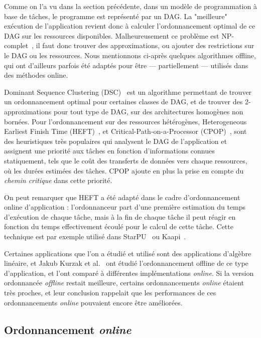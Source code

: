 Comme on l'a vu dans la section précédente, dans un modèle de programmation à base de tâches, le programme est représenté par un DAG.
La "meilleure" exécution de l'application revient donc à calculer l'ordonnancement optimal de ce DAG sur les ressources disponibles.
Malheureusement ce problème est NP-complet~\cite{Cook1971}, il faut donc trouver des approximations, ou ajouter des restrictions sur le DAG ou les ressources.
Nous mentionnons ci-après quelques algorithmes offline, qui ont d'ailleurs parfois été adaptés pour être --- partiellement --- utilisés dans des méthodes online.

Dominant Sequence Clustering (DSC)~\cite{Yang1994} est un algorithme permettant de trouver un ordonnancement optimal pour certaines classes de DAG, et de trouver des 2-approximations pour tout type de DAG, sur des architectures homogènes non bornées.
Pour l'ordonnancement sur des ressources hétérogènes, Heterogeneous Earliest Finish Time (HEFT)~\cite{HEFT}, et Critical-Path-on-a-Processor (CPOP)~\cite{HEFT}, sont des heuristiques très populaires qui analysent le DAG de l'application et assignent une priorité aux tâches en fonction d'informations connues statiquement, tels que le coût des transferts de données vers chaque ressources, où les durées estimées des tâches.
CPOP ajoute en plus la prise en compte du \emph{chemin critique} dans cette priorité.

On peut remarquer que HEFT a été adapté dans le cadre d'ordonnancement online d'application : l'ordonnanceur part d'une première estimation du temps d'exécution de chaque tâche, mais à la fin de chaque tâche il peut réagir en fonction du temps effectivement écoulé pour le calcul de cette tâche. Cette technique est par exemple utilisé dans StarPU~\cite{StarPU} ou Kaapi~\cite{Lima2015}.

Certaines applications que l'on a étudié et utilisé sont des applications d'algèbre linéaire, et Jakub Kurzak et al.~\cite{Kurzak2010} ont étudié l'ordonnancement offline de ce type d'application, et l'ont comparé à différentes implémentations \emph{online}.
Si la version ordonnancée \emph{offline} restait meilleure, certains ordonnancements \emph{online} étaient très proches, et leur conclusion rappelait que les performances de ces ordonnancements \emph{online} pouvaient encore être améliorées.



\subsection{Ordonnancement \emph{online}}

